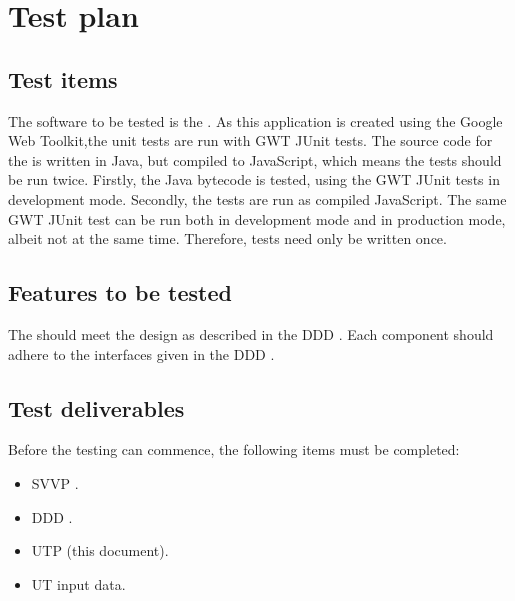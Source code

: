 \chapter{Test plan}\label{chap:testPlan}

\section{Test items}
The software to be tested is the \applicationname{}. As this application is created using the Google Web Toolkit,the unit tests are run with GWT JUnit tests. The source code for the \applicationname{} is written in Java, but compiled to JavaScript, which means the tests should be run twice. Firstly, the Java bytecode is tested, using the GWT JUnit tests in development mode. Secondly, the tests are run as compiled JavaScript. The same GWT JUnit test can be run both in development mode and in production mode, albeit not at the same time. Therefore, tests need only be written once.



\section{Features to be tested}
The \applicationname{} should meet the design as described in the DDD \cite{DDD}. Each component should adhere to the interfaces given in the DDD \cite{DDD}.

\section{Test deliverables}
Before the testing can commence, the following items must be completed:

\begin{itemize}
  \item SVVP \cite{svvp}.
  \item DDD \cite{DDD}.
  \item UTP (this document).
  \item UT input data.
\end{itemize}

